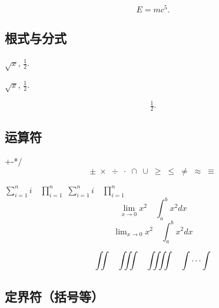 \documentclass[UTF8]{ctexart} %
\begin{document}
\begin{equation*}
E=mc^5.
\end{equation*}


\subsection{根式与分式}

$\sqrt{x}$, $\frac{1}{2}$.


$\sqrt{x}$, $\tfrac{1}{2}$.

\[ \tfrac{1}{2}. \]


\subsection{运算符}

+-*/
\[ \pm\; \times \; \div\; \cdot\; \cap\; \cup\;
\geq\; \leq\; \neq\; \approx \; \equiv \]



$ \sum_{i=1}^n i\quad \prod_{i=1}^n $
$ \sum\limits _{i=1}^n i\quad \prod\limits _{i=1}^n $
\[ \lim_{x\to0}x^2 \quad \int_a^b x^2 dx \]
\[ \lim\nolimits _{x\to0}x^2\quad \int\nolimits_a^b x^2 dx \]

\[ \iint\quad \iiint\quad \iiiint\quad \idotsint \]


\subsection{定界符（括号等）}


\end{document}

